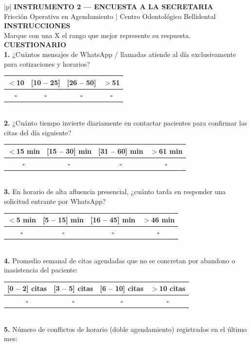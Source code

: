 \medskip\small
\begin{longtable}{|p{\fichawidth}|}
\hline
{}\textbf{INSTRUMENTO 2 — ENCUESTA A LA SECRETARIA} \\[-2pt]
Fricción Operativa en Agendamiento | Centro Odontológico Bellidental \\
\hline
{}\textbf{INSTRUCCIONES} \\
\hline
Marque con una X el rango que mejor represente su respuesta. \\
\hline
{}\textbf{CUESTIONARIO} \\
\hline
\textbf{1.} ¿Cuántos mensajes de WhatsApp / llamadas atiende al día exclusivamente para cotizaciones y horarios? \\[2pt]
\begin{tabular}{|c|c|c|c|}
\hline
\textbf{$<$10} & \textbf{[10 -- 25]} & \textbf{[26 -- 50]} & \textbf{$>$51} \\ \hline
$\square$ & $\square$ & $\square$ & $\square$ \\ \hline
\end{tabular} \\
\hline
\textbf{2.} ¿Cuánto tiempo invierte diariamente en contactar pacientes para confirmar las citas del día siguiente? \\[2pt]
\begin{tabular}{|c|c|c|c|}
\hline
\textbf{$<$15 min} & \textbf{[15 -- 30] min} & \textbf{[31 -- 60] min} & \textbf{$>$61 min} \\ \hline
$\square$ & $\square$ & $\square$ & $\square$ \\ \hline
\end{tabular} \\
\hline
\textbf{3.} En horario de alta afluencia presencial, ¿cuánto tarda en responder una solicitud entrante por WhatsApp? \\[2pt]
\begin{tabular}{|c|c|c|c|}
\hline
\textbf{$<$5 min} & \textbf{[5 -- 15] min} & \textbf{[16 -- 45] min} & \textbf{$>$46 min} \\ \hline
$\square$ & $\square$ & $\square$ & $\square$ \\ \hline
\end{tabular} \\
\hline
\textbf{4.} Promedio semanal de citas agendadas que no se concretan por abandono o inasistencia del paciente: \\[2pt]
\begin{tabular}{|c|c|c|c|}
\hline
\textbf{[0 -- 2] citas} & \textbf{[3 -- 5] citas} & \textbf{[6 -- 10] citas} & \textbf{$>$10 citas} \\ \hline
$\square$ & $\square$ & $\square$ & $\square$ \\ \hline
\end{tabular} \\
\hline
\textbf{5.} Número de conflictos de horario (doble agendamiento) registrados en el último mes: \\[2pt]
\underline{\hspace{5cm}} \\
\hline
\end{longtable}

